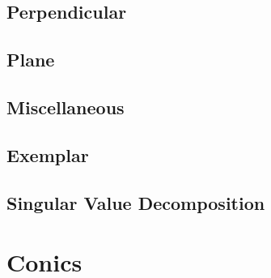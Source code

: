 \documentclass[journal,12pt,onecolumn]{IEEEtran}
\begin{document}
\subsection{Perpendicular}

\subsection{Plane}

\subsection{Miscellaneous }

\subsection{Exemplar}

\subsection{Singular Value Decomposition}

%
%
%
%
%
%
%

%
\section{Conics}
\end{document}
